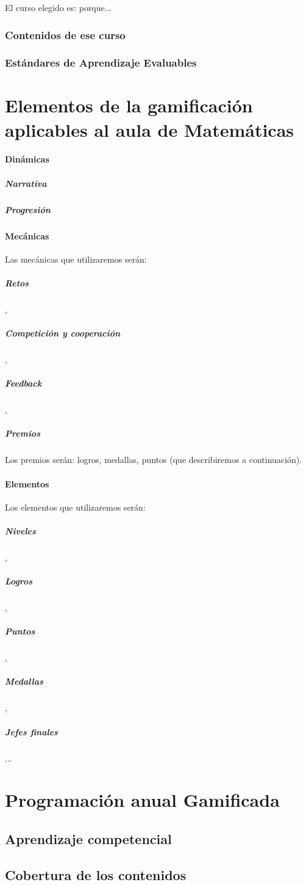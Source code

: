 \documentclass[a4paper, 12pt]{book}
\begin{document}
El curso elegido es: porque...

\subsubsection{Contenidos de ese curso}
\subsubsection{Estándares de Aprendizaje Evaluables}


\section{Elementos de la gamificación aplicables al aula de Matemáticas}

\paragraph{Dinámicas}

\subparagraph{Narrativa}
\subparagraph{Progresión}

\paragraph{Mecánicas}

Las mecánicas que utilizaremos serán:
\subparagraph{Retos},
\subparagraph{Competición y cooperación},
\subparagraph{Feedback},
\subparagraph{Premios}

 Los premios serán: logros, medallas, puntos (que describiremos a continuación).

\paragraph{Elementos}

Los elementos que utilizaremos serán:
\subparagraph{Niveles},
\subparagraph{Logros},
\subparagraph{Puntos},
\subparagraph{Medallas},
\subparagraph{Jefes finales}...

\section{Programación anual Gamificada}

\subsection{Aprendizaje competencial}
\subsection{Cobertura de los contenidos}
\end{document}
